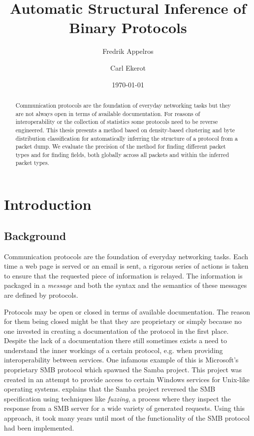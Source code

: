 \documentclass[a4paper]{report}
\newcommand\blankpage{%
    \null
    \thispagestyle{empty}%
    \addtocounter{page}{-1}%
    \newpage}
\begin{document}
\title{Automatic Structural Inference of Binary Protocols}
\author{Fredrik Appelros \and Carl Ekerot}
\date{\today}
\maketitle
\blankpage

\begin{abstract}
Communication protocols are the foundation of everyday networking tasks but
they are not always open in terms of available documentation. For reasons of
interoperability or the collection of statistics some protocols need to be
reverse engineered. This thesis presents a method based on density-based
clustering and byte distribution classification for automatically inferring the
structure of a protocol from a packet dump. We evaluate the precision of the
method for finding different packet types and for finding fields, both globally
across all packets and within the inferred packet types.
\end{abstract}
\blankpage

\tableofcontents

\chapter{Introduction}

\section{Background}
Communication protocols are the foundation of everyday networking tasks. Each
time a web page is served or an email is sent, a rigorous series of actions is
taken to ensure that the requested piece of information is relayed. The
information is packaged in a \emph{message} and both the syntax and the
semantics of these messages are defined by protocols.

Protocols may be open or closed in terms of available documentation. The reason
for them being closed might be that they are proprietary or simply because no
one invested in creating a documentation of the protocol in the first place.
Despite the lack of a documentation there still sometimes exists a need to
understand the inner workings of a certain protocol, e.g. when providing
interoperability between services. One infamous example of this is Microsoft's
proprietary SMB protocol which spawned the Samba project. This project was
created in an attempt to provide access to certain Windows services for
Unix-like operating systems. \citet{tridgell03} explains that the Samba project
reversed the SMB specification using techniques like \emph{fuzzing}, a process
where they inspect the response from a SMB server for a wide variety of
generated requests. Using this approach, it took many years until most of the
functionality of the SMB protocol had been implemented.
\end{document}
